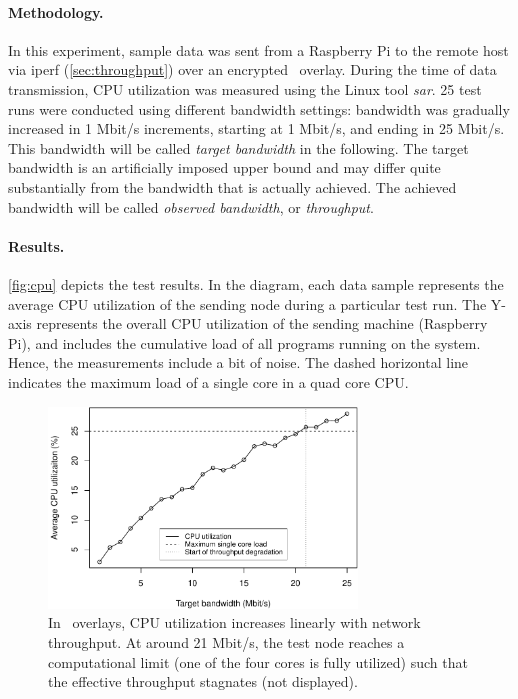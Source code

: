 \paragraph{Methodology.} In this experiment, sample data was sent from a Raspberry Pi to the remote host via iperf (\cf \autoref{sec:throughput}) over an encrypted \wnet\ overlay. During the time of data transmission, CPU utilization was measured using the Linux tool \emph{sar}. 25 test runs were conducted using different bandwidth settings: bandwidth was gradually increased in 1 Mbit/s increments, starting at 1 Mbit/s, and ending in 25 Mbit/s. This bandwidth will be called \emph{target bandwidth} in the following. The target bandwidth is an artificially imposed upper bound and may differ quite substantially from the bandwidth that is actually achieved. The achieved bandwidth will be called \emph{observed bandwidth}, or \emph{throughput}.

\paragraph{Results.} 
\autoref{fig:cpu} depicts the test results. In the diagram, each data sample represents the average CPU utilization of the sending node during a particular test run. The Y-axis represents the overall CPU utilization of the sending machine (Raspberry Pi), and includes the cumulative load of all programs running on the system. Hence, the measurements include a bit of noise. The dashed horizontal line indicates the maximum load of a single core in a quad core CPU.
\begin{figure}[htpb]
  \centering
  \includegraphics[width=0.73\textwidth]{figures/cpu}
  \caption[\weave\ CPU utilization test results]{In \weave\ overlays, CPU utilization increases linearly with network throughput. At around 21 Mbit/s, the test node reaches a computational limit (one of the four cores is fully utilized) such that the effective throughput stagnates (not displayed).}\label{fig:cpu}
\end{figure}

